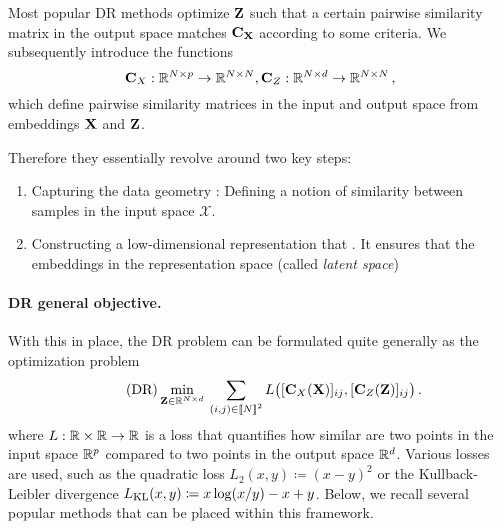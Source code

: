 Most popular DR methods optimize ${\mathbf{Z}}$ such that a certain pairwise similarity matrix in the output space matches ${\mathbf{C}}_{{\mathbf{X}}}$ according to some criteria. We subsequently introduce the functions
\begin{equation}
\label{eq:sim_function}
{\mathbf{C}}_{X}: \mathbb{R}^{N \times p} \to \mathbb{R}^{N \times N}, {\mathbf{C}}_{Z}: \mathbb{R}^{N \times d} \to \mathbb{R}^{N \times N}\,,
\end{equation}
which define pairwise similarity matrices in the input and output space from embeddings ${\mathbf{X}}$ and ${\mathbf{Z}}$.


Therefore they essentially revolve around two key steps:

\begin{enumerate}
	\item Capturing the data geometry : Defining a notion of similarity between samples in the input space $\mathcal{X}$.
	\item Constructing a low-dimensional representation that . It ensures that the embeddings in the representation space (called \emph{latent space}) 
\end{enumerate}


 
\paragraph{DR general objective.} With this in place, the DR problem can be formulated quite generally as the optimization problem
\begin{equation}
\label{eq:DR_criterion}\tag{DR}
\min_{\mZ \in \R^{N \times d}} \: \sum_{(i,j) \in \integ{N}^2}  L\big([\simiX(\mX)]_{ij}, [\simi(\mZ)]_{ij}\big) \,. %
\end{equation}
where $L:\mathbb{R} \times \mathbb{R} \rightarrow \mathbb{R}$ is a loss that quantifies how similar are two points in the input space $\mathbb{R}^{p}$ compared to two points in the output space $\mathbb{R}^{d}$. Various losses are used, such as the quadratic loss $L_2(x,y) \coloneqq (x - y)^2$
or the Kullback-Leibler divergence $L_{\operatorname{KL}}(x,y) \coloneqq x \log (x/y) - x +y$.
Below, we recall several popular methods that can be placed within this framework.



